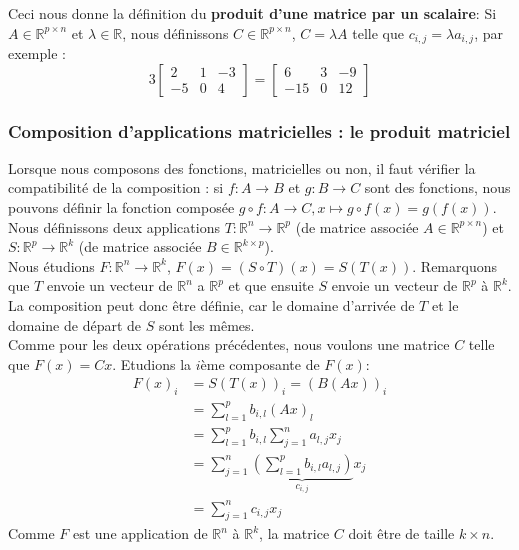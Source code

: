 \documentclass{article}
\newcommand{\R}{\mathbb{R}}
\newcommand{\cross}{\times}
\begin{document}
\noindent Ceci nous donne la définition du \textbf{produit d'une matrice par un scalaire}: Si $A \in \R ^{p \cross n}$ et $\lambda \in \R$, nous définissons $C \in \R ^{p \cross n}$, $C=\lambda A$ telle que $c_{i,j} = \lambda a_{i,j}$, par exemple :
$$3\begin{bmatrix} 2 & 1 & -3 \\ -5 & 0 & 4 \end{bmatrix} = \begin{bmatrix} 6 & 3 & -9 \\ -15 & 0 & 12 \end{bmatrix}
$$

\subsubsection{Composition d'applications matricielles : le produit matriciel}
\noindent Lorsque nous composons des fonctions, matricielles ou non, il faut vérifier la compatibilité de la composition : si $f: A \to B$ et $g : B \to C$ sont des fonctions, nous pouvons définir la fonction composée $g \circ f : A \to C, x \mapsto g \circ f(x) = g(f(x))$.\\

\noindent Nous définissons deux applications $T: \R ^n \to \R^p$ (de matrice associée $A \in \R^{p \cross n}$) et $S: \R ^p \to \R^k$ (de matrice associée $B \in \R^{k \cross p}$). \\

\noindent Nous étudions $F: \R^n \to \R^k$, $F(x) = (S \circ T)(x) = S(T(x))$. Remarquons que $T$ envoie un vecteur de $\R^n$ a $\R^p$ et que ensuite $S$ envoie un vecteur de $\R^p$ à $\R^k$. La composition peut donc être définie, car le domaine d'arrivée de $T$ et le domaine de départ de $S$ sont les mêmes. \\

\noindent Comme pour les deux opérations précédentes, nous voulons une matrice $C$ telle que $F(x) = Cx$. Etudions la $i$ème composante de $F(x)$:
\begin{align*}
    F(x)_i &= S(T(x))_i = (B(Ax))_i \\
    &= \sum_{l=1}^{p} b_{i,l} (Ax)_l \\
    &= \sum_{l=1}^{p} b_{i,l} \sum_{j=1}^n a_{l,j} x_j \\
    &= \sum_{j=1}^{n} \underbrace{\left( \sum_{l=1}^{p} b_{i,l} a_{l,j} \right)}_{c_{i,j}} x_j \\
    &= \sum_{j=1}^{n} c_{i,j} x_j
\end{align*}
Comme $F$ est une application de $\R^n$ à $\R^k$, la matrice $C$ doit être de taille $k \cross n$.\\
\end{document}
